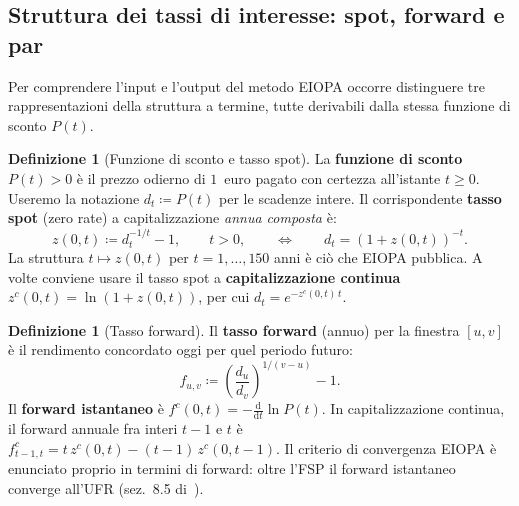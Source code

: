 \documentclass[11pt,a4paper]{article}
\theoremstyle{plain}
\theoremstyle{definition}
\newtheorem{definizione}[teorema]{Definizione}
\theoremstyle{remark}
\newcommand{\defeq}{\coloneqq}
\begin{document}
\subsection{Struttura dei tassi di interesse: spot, forward e par}
\label{sec:tassi-def}

Per comprendere l'input e l'output del metodo EIOPA occorre distinguere tre
rappresentazioni della struttura a termine, tutte derivabili dalla stessa funzione di
sconto $P(t)$.

\begin{definizione}[Funzione di sconto e tasso spot]
La \textbf{funzione di sconto} $P(t)>0$ \`e il prezzo odierno di $1$~euro pagato con
certezza all'istante $t \ge 0$. Useremo la notazione $d_t \defeq P(t)$ per le scadenze
intere. Il corrispondente \textbf{tasso spot} (zero rate) a capitalizzazione
\emph{annua composta} \`e:
\[
  z(0,t) \defeq d_t^{-1/t} - 1, \qquad t > 0,
  \qquad\Longleftrightarrow\qquad d_t = (1+z(0,t))^{-t}.
\]
La struttura $t \mapsto z(0,t)$ per $t=1,\ldots,150$ anni \`e ci\`o che EIOPA pubblica.
A volte conviene usare il tasso spot a \textbf{capitalizzazione continua}
$z^c(0,t) = \ln(1+z(0,t))$, per cui $d_t = e^{-z^c(0,t)\,t}$.
\end{definizione}

\begin{definizione}[Tasso forward]
Il \textbf{tasso forward} (annuo) per la finestra $[u,v]$ \`e il rendimento concordato
oggi per quel periodo futuro:
\[
  f_{u,v} \defeq \left(\frac{d_u}{d_v}\right)^{1/(v-u)} - 1.
\]
Il \textbf{forward istantaneo} \`e $f^c(0,t) = -\frac{\mathrm d}{\mathrm dt}\ln P(t)$.
In capitalizzazione continua, il forward annuale fra interi $t-1$ e $t$ \`e
$f^c_{t-1,t} = t\,z^c(0,t) - (t-1)\,z^c(0,t-1)$.
Il criterio di convergenza EIOPA \`e enunciato proprio in termini di forward: oltre
l'FSP il forward istantaneo converge all'UFR (sez.~8.5 di~\cite{eiopa2026}).
\end{definizione}
\end{document}
